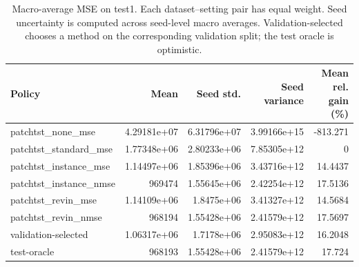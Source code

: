 \begin{table}[htbp]
\centering
\caption{Macro-average MSE on test1. Each dataset--setting pair has equal weight. Seed uncertainty is computed across seed-level macro averages. Validation-selected chooses a method on the corresponding validation split; the test oracle is optimistic.}
\begin{tabular}{lrrrr}
\toprule
Policy & Mean & Seed std. & Seed variance & Mean rel. gain (\%) \\
\midrule
patchtst\_none\_mse & 4.29181e+07 & 6.31796e+07 & 3.99166e+15 & -813.271 \\
patchtst\_standard\_mse & 1.77348e+06 & 2.80233e+06 & 7.85305e+12 & 0 \\
patchtst\_instance\_mse & 1.14497e+06 & 1.85396e+06 & 3.43716e+12 & 14.4437 \\
patchtst\_instance\_nmse & 969474 & 1.55645e+06 & 2.42254e+12 & 17.5136 \\
patchtst\_revin\_mse & 1.14109e+06 & 1.8475e+06 & 3.41327e+12 & 14.5684 \\
patchtst\_revin\_nmse & 968194 & 1.55428e+06 & 2.41579e+12 & 17.5697 \\
validation-selected & 1.06317e+06 & 1.7178e+06 & 2.95083e+12 & 16.2048 \\
\midrule
test-oracle & 968193 & 1.55428e+06 & 2.41579e+12 & 17.724 \\
\bottomrule
\end{tabular}
\end{table}
